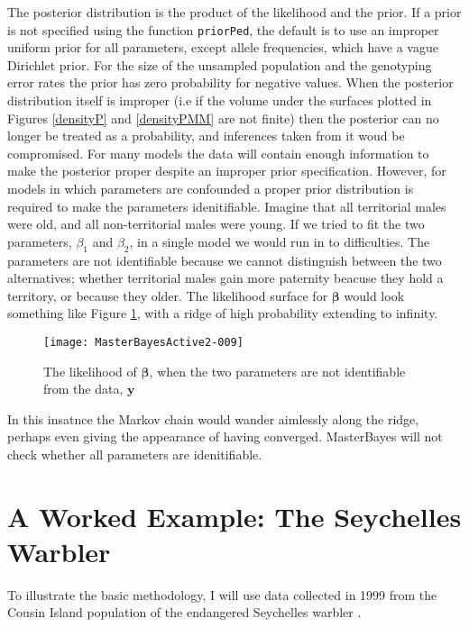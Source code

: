 \documentclass{article}
\begin{document}
The posterior distribution is the product of the likelihood and the prior. If a prior is not specified using the function \texttt{priorPed}, the default is to use an improper uniform prior for all parameters, except allele frequencies, which have a vague Dirichlet prior. For the size of the unsampled population and the genotyping error rates the prior has zero probability for negative values.  When the posterior distribution itself is improper (i.e if the volume under the surfaces plotted in Figures \ref{densityP} and \ref{densityPMM} are not finite) then the posterior can no longer be treated as a probability, and inferences taken from it woud be compromised.  For many models the data will contain enough information to make the posterior proper despite an improper prior specification. However, for models in which parameters are confounded a proper prior distribution is required to make the parameters idenitifiable.  Imagine that all territorial males were old, and all non-territorial males were young. If we tried to fit the two parameters, $\beta_{1}$ and $\beta_{2}$, in a single model we would run in to difficulties.  The parameters are not identifiable because we cannot distinguish between the two alternatives; whether territorial males gain more paternity beacuse they hold a territory, or because they older.  The likelihood surface for $\bm{\beta}$ would look something like Figure \ref{likP}, with a ridge of high probability extending to infinity.\\  

\begin{figure}[!h]
\begin{center}
\texttt{[image: MasterBayesActive2-009]}
\end{center}
\caption{The likelihood of $\bm{\beta}$, when the two parameters are not identifiable from the data, $\bm{y}$}
\label{likP}
\end{figure}

In this insatnce the Markov chain would wander aimlessly along the ridge, perhaps even giving the appearance of having converged.  MasterBayes will not check whether all parameters are idenitifiable.

\section{\large{A Worked Example: The Seychelles Warbler}}
\label{Warbler-sec}

To illustrate the basic methodology, I will use data collected in 1999 from the Cousin Island population of the endangered Seychelles warbler \citep{Richardson.2001}. 
\end{document}
